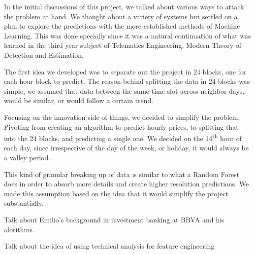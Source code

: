 \documentclass[12pt]{report} %
\begin{document}
In the initial discussions of this project, we talked about various ways to attack the problem at hand.
We thought about a variety of systems but settled on a plan to explore the predictions with the more established methods of Machine Learning.
This was done specially since it was a natural continuation of what was learned in the third year subject of Telematics Engineering, Modern Theory of Detection and Estimation.

The first idea we developed was to separate out the project in 24 blocks, one for each hour block to predict.
The reason behind splitting the data in 24 blocks was simple, we assumed that data between the same time slot across neighbor days, would be similar, or would follow a certain trend.

Focusing on the innovation side of things, we decided to simplify the problem.
Pivoting from creating an algorithm to predict hourly prices, to splitting that into the 24 blocks, and predicting a single one.
We decided on the 14\textsuperscript{th} hour of each day, since irrespective of the day of the week, or holiday, it would always be a valley period.

This kind of granular breaking up of data is similar to what a Random Forest does in order to absorb more details and create higher resolution predictions. We made this assumption based on the idea that it would simplify the project substantially.

Talk about Emilio's background in investment banking at BBVA and his alorithms.

Talk about the idea of using technical analysis for feature engineering



\end{document}
